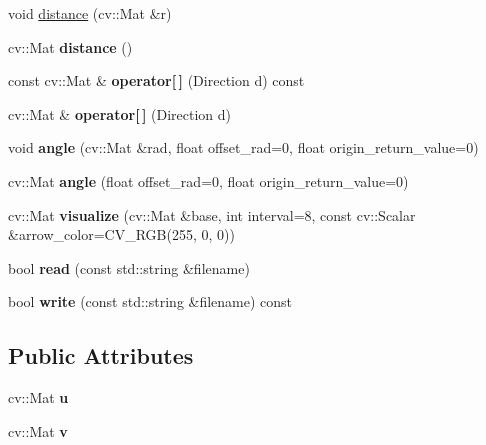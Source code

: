 \begin{DoxyCompactItemize}
\item 
void \hyperlink{classskl_1_1_flow_af771e593b403a1b807ec5564409188f1}{distance} (cv\+::\+Mat \&r)
\item 
\hypertarget{classskl_1_1_flow_aad7005f577155b3486db299c36926b65}{}\label{classskl_1_1_flow_aad7005f577155b3486db299c36926b65} 
cv\+::\+Mat {\bfseries distance} ()
\item 
\hypertarget{classskl_1_1_flow_ab52e31d8d97e1ea2e7d6258a40636055}{}\label{classskl_1_1_flow_ab52e31d8d97e1ea2e7d6258a40636055} 
const cv\+::\+Mat \& {\bfseries operator\mbox{[}$\,$\mbox{]}} (Direction d) const
\item 
\hypertarget{classskl_1_1_flow_ad25fe4621fb0a59cf11f897369cf6ad8}{}\label{classskl_1_1_flow_ad25fe4621fb0a59cf11f897369cf6ad8} 
cv\+::\+Mat \& {\bfseries operator\mbox{[}$\,$\mbox{]}} (Direction d)
\item 
\hypertarget{classskl_1_1_flow_a28aebd0d1764c11106df8b71fc3651ee}{}\label{classskl_1_1_flow_a28aebd0d1764c11106df8b71fc3651ee} 
void {\bfseries angle} (cv\+::\+Mat \&rad, float offset\+\_\+rad=0, float origin\+\_\+return\+\_\+value=0)
\item 
\hypertarget{classskl_1_1_flow_a05c0dd2eb0f250678497977ce8f2c4cd}{}\label{classskl_1_1_flow_a05c0dd2eb0f250678497977ce8f2c4cd} 
cv\+::\+Mat {\bfseries angle} (float offset\+\_\+rad=0, float origin\+\_\+return\+\_\+value=0)
\item 
\hypertarget{classskl_1_1_flow_ae80c303a98e877b5573bbeffcd9d96a4}{}\label{classskl_1_1_flow_ae80c303a98e877b5573bbeffcd9d96a4} 
cv\+::\+Mat {\bfseries visualize} (cv\+::\+Mat \&base, int interval=8, const cv\+::\+Scalar \&arrow\+\_\+color=C\+V\+\_\+\+R\+GB(255, 0, 0))
\item 
\hypertarget{classskl_1_1_flow_a931d778cd2124acacf264777cae38eee}{}\label{classskl_1_1_flow_a931d778cd2124acacf264777cae38eee} 
bool {\bfseries read} (const std\+::string \&filename)
\item 
\hypertarget{classskl_1_1_flow_a3696523a55d599b88d4971eb3d023fea}{}\label{classskl_1_1_flow_a3696523a55d599b88d4971eb3d023fea} 
bool {\bfseries write} (const std\+::string \&filename) const
\end{DoxyCompactItemize}
\subsection*{Public Attributes}
\begin{DoxyCompactItemize}
\item 
\hypertarget{classskl_1_1_flow_a2aa676dc599de74aa6776946d697d0e0}{}\label{classskl_1_1_flow_a2aa676dc599de74aa6776946d697d0e0} 
cv\+::\+Mat {\bfseries u}
\item 
\hypertarget{classskl_1_1_flow_a1ecd332e688a2766d7946bce1707c4a0}{}\label{classskl_1_1_flow_a1ecd332e688a2766d7946bce1707c4a0} 
cv\+::\+Mat {\bfseries v}
\end{DoxyCompactItemize}
